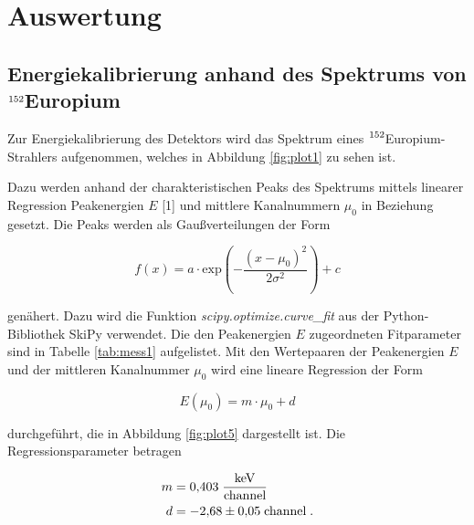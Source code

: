 \section{Auswertung}
\label{sec:Auswertung}


\subsection{Energiekalibrierung anhand des Spektrums von $\ce{^{152}}$Europium}

Zur Energiekalibrierung des Detektors wird das Spektrum eines $\ce{^{152}}$Europium-Strahlers aufgenommen, welches in Abbildung
\ref{fig:plot1} zu sehen ist.



Dazu werden anhand der charakteristischen Peaks des Spektrums mittels linearer Regression Peakenergien $E$ [1] und mittlere 
Kanalnummern $\mu_0$ in Beziehung gesetzt.
Die Peaks werden als Gaußverteilungen der Form 

\begin{equation}
  f(x) = a \cdot \text{exp}\left( - \frac{(x-\mu_0)^2}{2\sigma^2}\right) + c
  \label{eqn:gauss}
\end{equation}

genähert. Dazu wird die Funktion \textit{scipy.optimize.curve\_fit} aus der Python-Bibliothek SkiPy verwendet.
Die den Peakenergien $E$ zugeordneten Fitparameter sind in Tabelle \ref{tab:mess1} aufgelistet.
Mit den Wertepaaren der Peakenergien $E$ und der mittleren Kanalnummer $\mu_0$ wird eine lineare Regression 
der Form

\begin{equation}
  E(\mu_0) = m \cdot \mu_0 + d
  \label{eqn:eich}
\end{equation}
  
durchgeführt, die in Abbildung \ref{fig:plot5} dargestellt ist.
Die Regressionsparameter betragen

\begin{align*}
  m &= \num{0.403}\;\frac{\si{\kilo\eV}}{\text{channel}} \\
  d &= \num{-2.68 +- 0.05}\;\text{channel} \; .
\end{align*}

